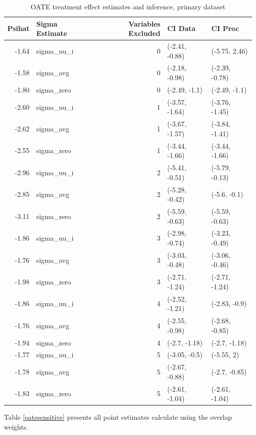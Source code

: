 \documentclass[12pt]{article}
\begin{document}
\begin{table}[ht]
\centering
\begin{tabular}{rlrll}
  \hline
Psihat & Sigma Estimate & Variables Excluded & CI Data & CI Proc \\ 
  \hline
-1.64 & sigma\_uu\_i & 0 & (-2.41, -0.88) & (-5.75, 2.46) \\ 
  -1.58 & sigma\_avg & 0 & (-2.18, -0.98) & (-2.39, -0.78) \\ 
  -1.80 & sigma\_zero & 0 & (-2.49, -1.1) & (-2.49, -1.1) \\ 
  -2.60 & sigma\_uu\_i & 1 & (-3.57, -1.64) & (-3.76, -1.45) \\ 
  -2.62 & sigma\_avg & 1 & (-3.67, -1.57) & (-3.84, -1.41) \\ 
  -2.55 & sigma\_zero & 1 & (-3.44, -1.66) & (-3.44, -1.66) \\ 
  -2.96 & sigma\_uu\_i & 2 & (-5.41, -0.51) & (-5.79, -0.13) \\ 
  -2.85 & sigma\_avg & 2 & (-5.28, -0.42) & (-5.6, -0.1) \\ 
  -3.11 & sigma\_zero & 2 & (-5.59, -0.63) & (-5.59, -0.63) \\ 
  -1.86 & sigma\_uu\_i & 3 & (-2.98, -0.74) & (-3.23, -0.49) \\ 
  -1.76 & sigma\_avg & 3 & (-3.03, -0.48) & (-3.06, -0.46) \\ 
  -1.98 & sigma\_zero & 3 & (-2.71, -1.24) & (-2.71, -1.24) \\ 
  -1.86 & sigma\_uu\_i & 4 & (-2.52, -1.21) & (-2.83, -0.9) \\ 
  -1.76 & sigma\_avg & 4 & (-2.55, -0.98) & (-2.68, -0.85) \\ 
  -1.94 & sigma\_zero & 4 & (-2.7, -1.18) & (-2.7, -1.18) \\ 
  -1.77 & sigma\_uu\_i & 5 & (-3.05, -0.5) & (-5.55, 2) \\ 
  -1.78 & sigma\_avg & 5 & (-2.67, -0.88) & (-2.7, -0.85) \\ 
  -1.83 & sigma\_zero & 5 & (-2.61, -1.04) & (-2.61, -1.04) \\ 
   \hline
\end{tabular}
   \caption{OATE treatment effect estimates and inference, primary dataset}
   \label{oateprimary}
\end{table}

Table \ref{oatesensitive} presents all point estimates calculate using the overlap weights.
\end{document}

